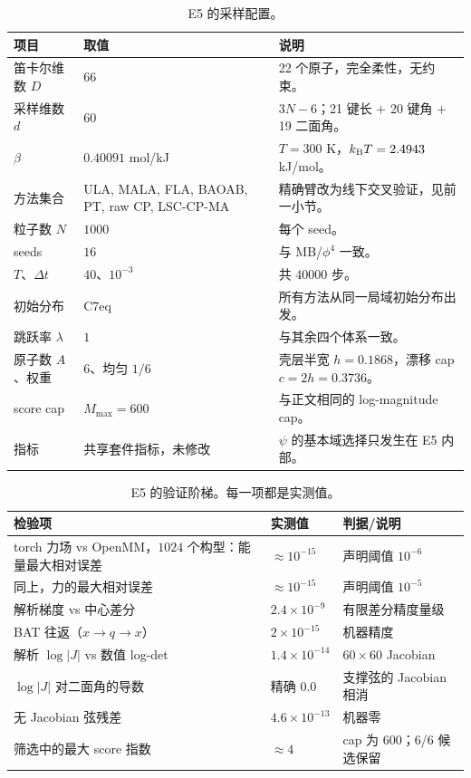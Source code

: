 \documentclass[11pt,a4paper]{article}
\renewcommand{\textsc}[1]{\textsf{\MakeUppercase{#1}}}
\begin{document}
\begin{table}[H]
\centering
\small
\begin{tabularx}{\textwidth}{L{3.6cm}L{5.2cm}Y}
\toprule
项目 & 取值 & 说明 \\
\midrule
笛卡尔维数 $D$ & $66$ & 22 个原子，完全柔性，无约束。 \\
采样维数 $d$ & $60$ & $3N-6$；21 键长 $+$ 20 键角 $+$ 19 二面角。 \\
$\beta$ & $0.40091$ mol/kJ & $T=300$ K，$k_{\rm B}T=2.4943$ kJ/mol。 \\
方法集合 & \textsc{ula}, \textsc{mala}, \textsc{fla}, \textsc{baoab}, \textsc{pt},
raw \textsc{cp}, \textsc{lsc-cp-ma} & 精确臂改为线下交叉验证，见前一小节。 \\
粒子数 $N$ & $1000$ & 每个 seed。 \\
seeds & $16$ & 与 MB/$\phi^4$ 一致。 \\
$T$、$\Delta t$ & $40$、$10^{-3}$ & 共 $40000$ 步。 \\
初始分布 & C7eq & 所有方法从同一局域初始分布出发。 \\
跳跃率 $\lambda$ & $1$ & 与其余四个体系一致。 \\
原子数 $A$、权重 & $6$、均匀 $1/6$ & 壳层半宽 $h=0.1868$，漂移 cap $c=2h=0.3736$。 \\
score cap & $M_{\max}=600$ & 与正文相同的 log-magnitude cap。 \\
指标 & 共享套件指标，未修改 & $\psi$ 的基本域选择只发生在 E5 内部。 \\
\bottomrule
\end{tabularx}
\caption{E5 的采样配置。}
\end{table}

\begin{table}[H]
\centering
\small
\begin{tabularx}{\textwidth}{L{6.2cm}C{3.2cm}Y}
\toprule
检验项 & 实测值 & 判据/说明 \\
\midrule
torch 力场 vs OpenMM，$1024$ 个构型：能量最大相对误差 &
$\approx10^{-15}$ & 声明阈值 $10^{-6}$ \\
同上，力的最大相对误差 &
$\approx10^{-15}$ & 声明阈值 $10^{-5}$ \\
解析梯度 vs 中心差分 & $2.4\times10^{-9}$ & 有限差分精度量级 \\
BAT 往返（$x\to q\to x$） & $2\times10^{-15}$ & 机器精度 \\
解析 $\log|J|$ vs 数值 log-det & $1.4\times10^{-14}$ & $60\times60$ Jacobian \\
$\log|J|$ 对二面角的导数 & 精确 $0.0$ & 支撑弦的 Jacobian 相消 \\
无 Jacobian 弦残差 & $4.6\times10^{-13}$ & 机器零 \\
筛选中的最大 score 指数 & $\approx4$ & cap 为 $600$；6/6 候选保留 \\
\bottomrule
\end{tabularx}
\caption{E5 的验证阶梯。每一项都是实测值。}
\end{table}
\end{document}
